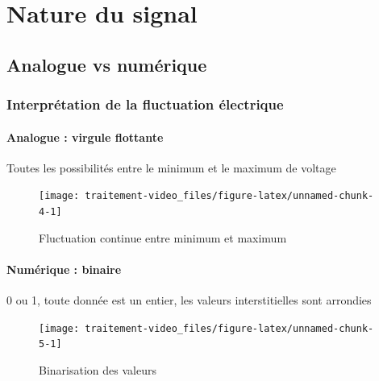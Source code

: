 \documentclass[
  french,
]{book}
\begin{document}
\hypertarget{nature-du-signal}{%
\section{Nature du signal}\label{nature-du-signal}}

\hypertarget{analogue-vs-numuxe9rique}{%
\subsection{Analogue vs numérique}\label{analogue-vs-numuxe9rique}}

\hypertarget{interpruxe9tation-de-la-fluctuation-uxe9lectrique}{%
\subsubsection{Interprétation de la fluctuation électrique}\label{interpruxe9tation-de-la-fluctuation-uxe9lectrique}}

\hypertarget{analogue-virgule-flottante}{%
\paragraph{Analogue : virgule flottante}\label{analogue-virgule-flottante}}

Toutes les possibilités entre le minimum et le maximum de voltage

\begin{figure}

{\centering \texttt{[image: traitement-video\_files/figure-latex/unnamed-chunk-4-1]} 

}

\caption{Fluctuation continue entre minimum et maximum}\label{fig:unnamed-chunk-4}
\end{figure}

\hypertarget{numuxe9rique-binaire}{%
\paragraph{Numérique : binaire}\label{numuxe9rique-binaire}}

0 ou 1, toute donnée est un entier, les valeurs interstitielles sont arrondies

\begin{figure}

{\centering \texttt{[image: traitement-video\_files/figure-latex/unnamed-chunk-5-1]} 

}

\caption{Binarisation des valeurs}\label{fig:unnamed-chunk-5}
\end{figure}
\end{document}
